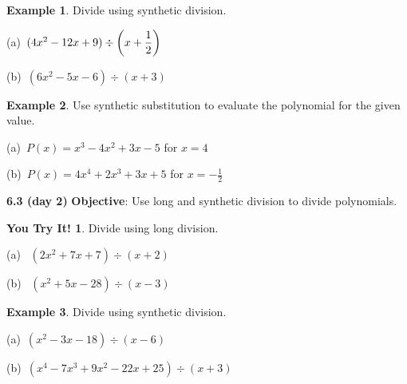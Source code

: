 \documentclass{report}
\theoremstyle{definition}
\newtheorem{example}{\bf Example}
\newtheorem{youtry}{\bf You Try It!}
\begin{document}
 \begin{example}
 Divide using synthetic division.
 \end{example}
\begin{minipage}[t]{0.45\linewidth}
(a) \,$(4x^2-12x+9)\div \bigg{(}x+\displaystyle\frac{1}{2}\bigg{)}$
\end{minipage}
 \hfill
\begin{minipage}[t]{0.45\linewidth}

(b) \,$(6x^2-5x-6)\div (x+3)$
\end{minipage}
\vfill
\begin{example}
Use synthetic substitution to evaluate the polynomial for the given value.
\end{example}

\begin{minipage}[t]{0.45\linewidth}
(a) \,$P(x)=x^3-4x^2+3x-5$ for $x=4$
\end{minipage}
 \hfill
\begin{minipage}[t]{0.45\linewidth}
(b) \,$P(x)=4x^4+2x^3+3x+5$ for $x=\displaystyle-\frac{1}{2}$
\end{minipage}
\vfill

 
 \noindent{}
 
 
 \newpage

\noindent\Large{\textbf{6.3 (day 2)}} 
  \indent\hfill\small\noindent \textbf{Objective}: Use long and synthetic division to divide polynomials.  \normalsize\\

 
 \begin{youtry}
 Divide using long division.
 \end{youtry}
 
\begin{minipage}[t]{0.45\linewidth}
(a) \, $(2x^2+7x+7)\div (x+2)$
\end{minipage}
 \hfill
 \begin{minipage}[t]{0.45\linewidth}
(b) \, $(x^2+5x-28)\div (x-3)$
\end{minipage}
\vfill
\vfill
 
 \begin{example}
 Divide using synthetic division.
 \end{example}
\begin{minipage}[t]{0.45\linewidth}
(a) \,$(x^2-3x-18)\div (x-6)$
\end{minipage}
 \hfill
\begin{minipage}[t]{0.45\linewidth}

(b) \,$(x^4-7x^3+9x^2-22x+25)\div (x+3)$
\end{minipage}
\vfill
\end{document}
